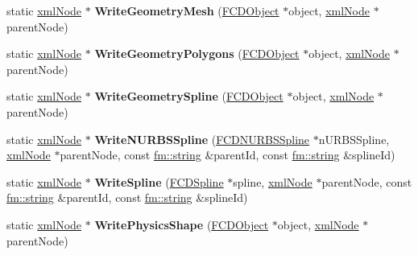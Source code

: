 \begin{DoxyCompactItemize}
\item 
\hypertarget{classFArchiveXML_ae90893f8799568dca2ecbfe9fe7e7ae2}{
static \hyperlink{struct__xmlNode}{xmlNode} $\ast$ {\bfseries WriteGeometryMesh} (\hyperlink{classFCDObject}{FCDObject} $\ast$object, \hyperlink{struct__xmlNode}{xmlNode} $\ast$parentNode)}
\label{classFArchiveXML_ae90893f8799568dca2ecbfe9fe7e7ae2}

\item 
\hypertarget{classFArchiveXML_aea52afa594e3ba2b4fec9d957e4f0852}{
static \hyperlink{struct__xmlNode}{xmlNode} $\ast$ {\bfseries WriteGeometryPolygons} (\hyperlink{classFCDObject}{FCDObject} $\ast$object, \hyperlink{struct__xmlNode}{xmlNode} $\ast$parentNode)}
\label{classFArchiveXML_aea52afa594e3ba2b4fec9d957e4f0852}

\item 
\hypertarget{classFArchiveXML_a410cc16f1df611a827df09d014e090bc}{
static \hyperlink{struct__xmlNode}{xmlNode} $\ast$ {\bfseries WriteGeometrySpline} (\hyperlink{classFCDObject}{FCDObject} $\ast$object, \hyperlink{struct__xmlNode}{xmlNode} $\ast$parentNode)}
\label{classFArchiveXML_a410cc16f1df611a827df09d014e090bc}

\item 
\hypertarget{classFArchiveXML_ace3dfa56ddb6c946e091ff8d660815f4}{
static \hyperlink{struct__xmlNode}{xmlNode} $\ast$ {\bfseries WriteNURBSSpline} (\hyperlink{classFCDNURBSSpline}{FCDNURBSSpline} $\ast$nURBSSpline, \hyperlink{struct__xmlNode}{xmlNode} $\ast$parentNode, const \hyperlink{classfm_1_1stringT}{fm::string} \&parentId, const \hyperlink{classfm_1_1stringT}{fm::string} \&splineId)}
\label{classFArchiveXML_ace3dfa56ddb6c946e091ff8d660815f4}

\item 
\hypertarget{classFArchiveXML_abcf93b607f671d8d78896642de2e7961}{
static \hyperlink{struct__xmlNode}{xmlNode} $\ast$ {\bfseries WriteSpline} (\hyperlink{classFCDSpline}{FCDSpline} $\ast$spline, \hyperlink{struct__xmlNode}{xmlNode} $\ast$parentNode, const \hyperlink{classfm_1_1stringT}{fm::string} \&parentId, const \hyperlink{classfm_1_1stringT}{fm::string} \&splineId)}
\label{classFArchiveXML_abcf93b607f671d8d78896642de2e7961}

\item 
\hypertarget{classFArchiveXML_a14bbd15a8629ef5cabded8c31f255e11}{
static \hyperlink{struct__xmlNode}{xmlNode} $\ast$ {\bfseries WritePhysicsShape} (\hyperlink{classFCDObject}{FCDObject} $\ast$object, \hyperlink{struct__xmlNode}{xmlNode} $\ast$parentNode)}
\label{classFArchiveXML_a14bbd15a8629ef5cabded8c31f255e11}


\end{DoxyCompactItemize}
